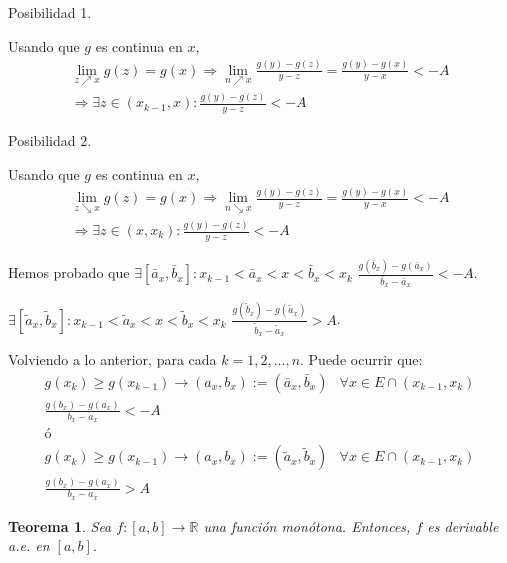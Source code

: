 \documentclass[11pt, a4paper]{article}
\makeatletter
\newif\IfInSansMode
\let\oldsf\sffamily
\renewcommand*{\sffamily}{\oldsf\mathversion{sans}\InSansModetrue}
\let\oldnorm\normalfont
\renewcommand*{\normalfont}{\oldnorm\InSansModefalse\mathversion{normal}}
\newcommand{\R}{\mathbb{R}} \newcommand{\N}{\mathbb{N}}
\renewenvironment{proof}[1][\proofname] {\par\pushQED{\qed}\normalfont\topsep6\p@\@plus6\p@\relax\trivlist\item[\hskip\labelsep\itshape\sffamily#1\@addpunct{.}]\ignorespaces}{\popQED\endtrivlist\@endpefalse}
\theoremstyle{theorem-style}
\newtheorem{nth}{Teorema}[section]
\theoremstyle{definition-style}
\theoremstyle{remark-style}
\theoremstyle{example-style}
\makeatother
\begin{document}
\begin{proof}
Posibilidad 1.

Usando que $g$ es continua en $x$, 
\begin{align*}
    \label{}
    \lim_{z \nearrow x} g(z) = g(x) \Rightarrow \lim_{n \nearrow x} \frac{g(y) - g(z)}{y-z} = \frac{g(y)-g(x)}{y-x} < - A \\
    \Rightarrow \exists z \in (x_{k-1}, x) : \frac{g(y) - g(z)}{y-z} < -A
\end{align*}

Posibilidad 2.

Usando que $g$ es continua en $x$, 
\begin{align*}
    \label{}
    \lim_{z \searrow x} g(z) = g(x) \Rightarrow \lim_{n \searrow x} \frac{g(y) - g(z)}{y-z} = \frac{g(y)-g(x)}{y-x} < - A \\
    \Rightarrow \exists z \in (x, x_{k}) : \frac{g(y) - g(z)}{y-z} < -A
\end{align*}

Hemos probado que $\exists [\bar{a}_x, \bar{b}_x] : x_{k-1} < \bar{a}_x < x < \bar{b}_x < x_k$ $\frac{g(\bar{b}_x)- g(\bar{a}_x)}{\bar{b}_x - \bar{a}_x} < - A$.

$\exists [\tilde{a}_x, \tilde{b}_x] : x_{k-1} < \tilde{a}_x < x < \tilde{b}_x < x_k$ $\frac{g(\tilde{b}_x)- g(\tilde{a}_x)}{\tilde{b}_x - \tilde{a}_x} > A$.


Volviendo a lo anterior, para cada $k = 1, 2, \hdots, n$. Puede ocurrir que:
\begin{align*}
    \label{e}
    g(x_k) \geq g(x_{k-1}) \rightarrow (a_x, b_x) := (\bar{a}_x, \bar{b}_x) &\forall x \in E \cap (x_{k-1}, x_k) \\
    \frac{g(b_x) - g(a_x)}{b_x - a_x} < -A \\
    ó \\
    g(x_k) \geq g(x_{k-1}) \rightarrow (a_x, b_x) := (\tilde{a}_x, \tilde{b}_x) &\forall x \in E \cap (x_{k-1}, x_k) \\
    \frac{g(b_x) - g(a_x)}{b_x - a_x} > A
\end{align*}


\end{proof}

\begin{nth}
    Sea $f : [a, b] \rightarrow \R$ una función monótona. Entonces, $f$ es derivable \textit{a.e.} en $[a, b]$.
\end{nth}
\end{document}
